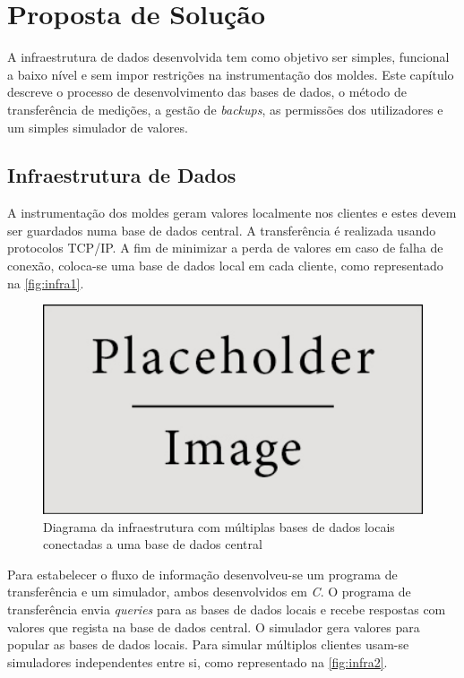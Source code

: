 \documentclass[11pt,twoside,a4paper]{report}
\begin{document}
\cleardoublepage
\chapter{Proposta de Solução}
A infraestrutura de dados desenvolvida tem como objetivo ser simples, funcional a baixo nível e sem impor restrições na instrumentação dos moldes. Este capítulo descreve o processo de desenvolvimento das bases de dados, o método de transferência de medições, a gestão de \textit{backups}, as permissões dos utilizadores e um simples simulador de valores.

\section{Infraestrutura de Dados}
A instrumentação dos moldes geram valores localmente nos clientes e estes devem ser guardados numa base de dados central. A transferência é realizada usando protocolos TCP/IP. A fim de minimizar a perda de valores em caso de falha de conexão, coloca-se uma base de dados local em cada cliente, como representado na \autoref{fig:infra1}.
\begin{figure}[H]
	\begin{center}
		\includegraphics[width=1\textwidth]{placeholder} %
		\caption{Diagrama da infraestrutura com múltiplas bases de dados locais conectadas a uma base de dados central}
		\label{fig:infra1}
		\end{center}
\end{figure}
Para estabelecer o fluxo de informação desenvolveu-se um programa de transferência e um simulador, ambos desenvolvidos em \textit{C}. O programa de transferência envia \textit{queries} para as bases de dados locais e recebe respostas com valores que regista na base de dados central. O simulador gera valores para popular as bases de dados locais. Para simular múltiplos clientes usam-se simuladores independentes entre si, como representado na \autoref{fig:infra2}.
\end{document}
